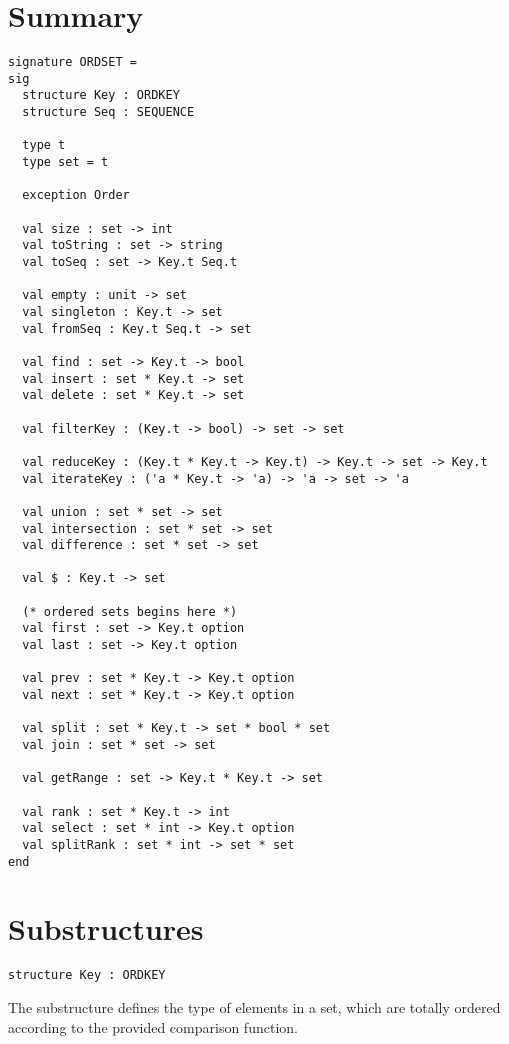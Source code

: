 \section{Summary}
\begin{gram}
\begin{verbatim}
signature ORDSET =
sig
  structure Key : ORDKEY
  structure Seq : SEQUENCE

  type t
  type set = t

  exception Order

  val size : set -> int
  val toString : set -> string
  val toSeq : set -> Key.t Seq.t

  val empty : unit -> set
  val singleton : Key.t -> set
  val fromSeq : Key.t Seq.t -> set

  val find : set -> Key.t -> bool
  val insert : set * Key.t -> set
  val delete : set * Key.t -> set

  val filterKey : (Key.t -> bool) -> set -> set

  val reduceKey : (Key.t * Key.t -> Key.t) -> Key.t -> set -> Key.t
  val iterateKey : ('a * Key.t -> 'a) -> 'a -> set -> 'a

  val union : set * set -> set
  val intersection : set * set -> set
  val difference : set * set -> set

  val $ : Key.t -> set

  (* ordered sets begins here *)
  val first : set -> Key.t option
  val last : set -> Key.t option

  val prev : set * Key.t -> Key.t option
  val next : set * Key.t -> Key.t option

  val split : set * Key.t -> set * bool * set
  val join : set * set -> set

  val getRange : set -> Key.t * Key.t -> set

  val rank : set * Key.t -> int
  val select : set * int -> Key.t option
  val splitRank : set * int -> set * set
end
\end{verbatim}
\end{gram}

\section{Substructures}

\begin{gram}
\begin{verbatim}
structure Key : ORDKEY
\end{verbatim}
The  substructure defines the type of elements in a set, which are
totally ordered according to the provided comparison function.
\end{gram}

